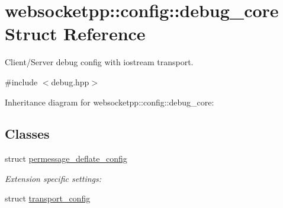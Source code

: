 \hypertarget{structwebsocketpp_1_1config_1_1debug__core}{}\section{websocketpp\+:\+:config\+:\+:debug\+\_\+core Struct Reference}
\label{structwebsocketpp_1_1config_1_1debug__core}


Client/\+Server debug config with iostream transport.  




{\ttfamily \#include $<$debug.\+hpp$>$}



Inheritance diagram for websocketpp\+:\+:config\+:\+:debug\+\_\+core\+:
\subsection*{Classes}
\begin{DoxyCompactItemize}
\item 
struct \mbox{\hyperlink{structwebsocketpp_1_1config_1_1debug__core_1_1permessage__deflate__config}{permessage\+\_\+deflate\+\_\+config}}
\begin{DoxyCompactList}\small\item\em Extension specific settings\+: \end{DoxyCompactList}\item 
struct \mbox{\hyperlink{structwebsocketpp_1_1config_1_1debug__core_1_1transport__config}{transport\+\_\+config}}
\end{DoxyCompactItemize}
